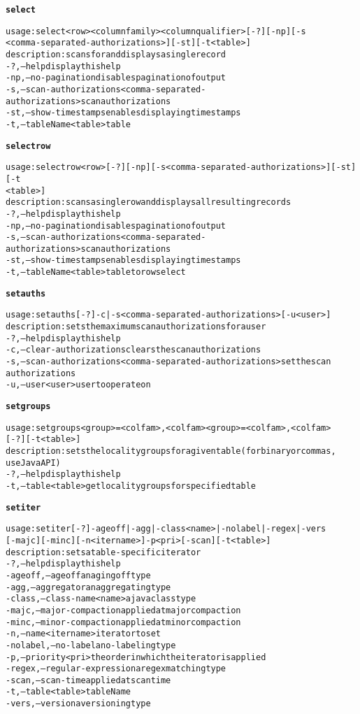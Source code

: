 \begin{alltt}
\textbf{select}

    usage: select <row> <columnfamily> <columnqualifier> [-?] [-np] [-s
    	      <comma-separated-authorizations>] [-st] [-t <table>]
    description: scans for and displays a single record
      -?,--help  display this help
      -np,--no-pagination  disables pagination of output
      -s,--scan-authorizations <comma-separated-authorizations>  scan authorizations
      -st,--show-timestamps  enables displaying timestamps
      -t,--tableName <table>  table

\textbf{selectrow}

    usage: selectrow <row> [-?] [-np] [-s <comma-separated-authorizations>] [-st] [-t
    	      <table>]
    description: scans a single row and displays all resulting records
      -?,--help  display this help
      -np,--no-pagination  disables pagination of output
      -s,--scan-authorizations <comma-separated-authorizations>  scan authorizations
      -st,--show-timestamps  enables displaying timestamps
      -t,--tableName <table>  table to row select

\textbf{setauths}

    usage: setauths [-?] -c | -s <comma-separated-authorizations>  [-u <user>]
    description: sets the maximum scan authorizations for a user
      -?,--help  display this help
      -c,--clear-authorizations  clears the scan authorizations
      -s,--scan-authorizations <comma-separated-authorizations>  set the scan
    	      authorizations
      -u,--user <user>  user to operate on

\textbf{setgroups}

    usage: setgroups <group>=<col fam>{,<col fam>}{ <group>=<col fam>{,<col fam>}}
    	      [-?] [-t <table>]
    description: sets the locality groups for a given table (for binary or commas,
    	      use Java API)
      -?,--help  display this help
      -t,--table <table>  get locality groups for specified table

\textbf{setiter}

    usage: setiter [-?] -ageoff | -agg | -class <name> | -nolabel | -regex | -vers 
    	      [-majc] [-minc] [-n <itername>]  -p <pri>  [-scan] [-t <table>]
    description: sets a table-specific iterator
      -?,--help  display this help
      -ageoff,--ageoff  an aging off type
      -agg,--aggregator  an aggregating type
      -class,--class-name <name>  a java class type
      -majc,--major-compaction  applied at major compaction
      -minc,--minor-compaction  applied at minor compaction
      -n,--name <itername>	iterator to set
      -nolabel,--no-label  a no-labeling type
      -p,--priority <pri>  the order in which the iterator is applied
      -regex,--regular-expression  a regex matching type
      -scan,--scan-time  applied at scan time
      -t,--table <table>  tableName
      -vers,--version  a versioning type


\end{alltt}
